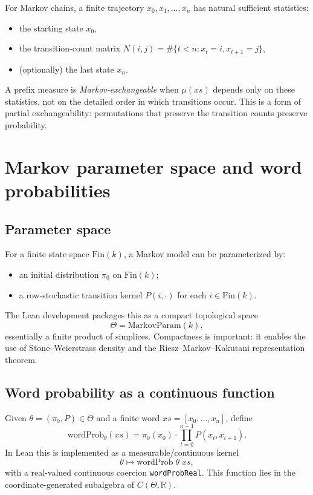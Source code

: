 \documentclass[11pt]{article}
\newcommand{\Fin}{\mathrm{Fin}}
\newcommand{\RR}{\mathbb{R}}
\newcommand{\1}{\mathbf{1}}
\begin{document}
For Markov chains, a finite trajectory $x_0,x_1,\dots,x_n$ has natural sufficient statistics:
\begin{itemize}[leftmargin=2em]
\item the starting state $x_0$,
\item the transition-count matrix $N(i,j)=\#\{t<n : x_t=i, x_{t+1}=j\}$,
\item (optionally) the last state $x_n$.
\end{itemize}

A prefix measure is \emph{Markov-exchangeable} when $\mu(xs)$ depends only on these statistics, not on the detailed order in which transitions occur.
This is a form of partial exchangeability: permutations that preserve the transition counts preserve probability.

\section{Markov parameter space and word probabilities}

\subsection{Parameter space}

For a finite state space $\Fin(k)$, a Markov model can be parameterized by:
\begin{itemize}[leftmargin=2em]
\item an initial distribution $\pi_0$ on $\Fin(k)$;
\item a row-stochastic transition kernel $P(i,\cdot)$ for each $i\in \Fin(k)$.
\end{itemize}

The Lean development packages this as a compact topological space
\[
\Theta = \mathrm{MarkovParam}(k),
\]
essentially a finite product of simplices.
Compactness is important: it enables the use of Stone--Weierstrass density and the Riesz--Markov--Kakutani representation theorem.

\subsection{Word probability as a continuous function}

Given $\theta=(\pi_0,P)\in \Theta$ and a finite word $xs=[x_0,\dots,x_n]$, define
\[
\mathrm{wordProb}_\theta(xs)=\pi_0(x_0)\cdot \prod_{t=0}^{n-1} P(x_t,x_{t+1}).
\]
In Lean this is implemented as a measurable/continuous kernel
\[
\theta \mapsto \mathrm{wordProb}\; \theta\; xs,
\]
with a real-valued continuous coercion \texttt{wordProbReal}.
This function lies in the coordinate-generated subalgebra of $C(\Theta,\RR)$.
\end{document}
